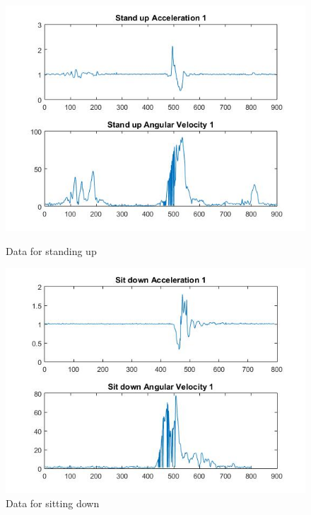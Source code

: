 \documentclass[letterpaper,12pt,titlepage,oneside,final]{book}
\begin{document}
\begin{figure}[h!]
	\centering
	\hspace{-2.3cm}
	\begin{minipage}[b]{0.5\textwidth}
		\centering
		\includegraphics[scale=0.5]{stand_up_1}
		\caption{Data for standing up}
	\end{minipage}%
	\hfill
	\begin{minipage}[b]{0.5\textwidth}
		\centering
		\includegraphics[scale=0.5]{sit_1}
		\caption{Data for sitting down}
	\end{minipage}	
\end{figure} 
\end{document}
